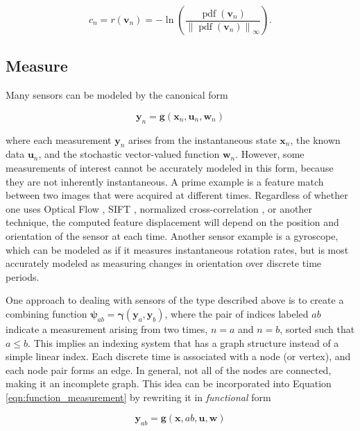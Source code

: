 \begin{equation}
c_n = r\left(\mathbf{v}_n\right) = -\operatorname{ln}\left(\frac{\operatorname{pdf}\left(\mathbf{v}_n\right)}{\left\| {\operatorname{pdf}\left( { \mathbf{v}_n } \right)} \right\|_\infty}\right).
\end{equation}

\subsection{Measure}\label{sec:measures}
Many sensors can be modeled by the canonical form

\begin{equation}
\mathbf{y}_n  = {\mathbf{g}}\left( {\mathbf{x}_n ,\mathbf{u}_n ,\mathbf{w}_n } \right)
\label{eqn:function_measurement}
\end{equation}

\noindent where each measurement $\mathbf{y}_n$ arises from the instantaneous state $\mathbf{x}_n$, the known data $\mathbf{u}_n$, and the stochastic vector-valued function $\mathbf{w}_n$. However, some measurements of interest cannot be accurately modeled in this form, because they are not inherently instantaneous. A prime example is a feature match between two images that were acquired at different times. Regardless of whether one uses Optical Flow \cite{Lucas1981}, SIFT \cite{SIFT}, normalized cross-correlation \cite{Lewis1995}, or another technique, the computed feature displacement will depend on the position and orientation of the sensor at each time. Another sensor example is a gyroscope, which can be modeled as if it measures instantaneous rotation rates, but is most accurately modeled as measuring changes in orientation over discrete time periods.

One approach to dealing with sensors of the type described above is to create a combining function $\mathbf{\psi}_{ab} = \mathbf{\gamma}\left(\mathbf{y}_a,\mathbf{y}_b\right)$, where the pair of indices labeled $ab$ indicate a measurement arising from two times, $n=a$ and $n=b$, sorted such that $a \leq b$. This implies an indexing system that has a graph structure instead of a simple linear index. Each discrete time is associated with a node (or vertex), and each node pair forms an edge. In general, not all of the nodes are connected, making it an incomplete graph. This idea can be incorporated into Equation \ref{eqn:function_measurement} by rewriting it in \emph{functional} form

\begin{equation}
\mathbf{y}_{ab}  = {\mathbf{g}}\left( {\mathbf{x},ab,\mathbf{u},\mathbf{w}} \right)
\label{eqn:functional_measurement}
\end{equation}

